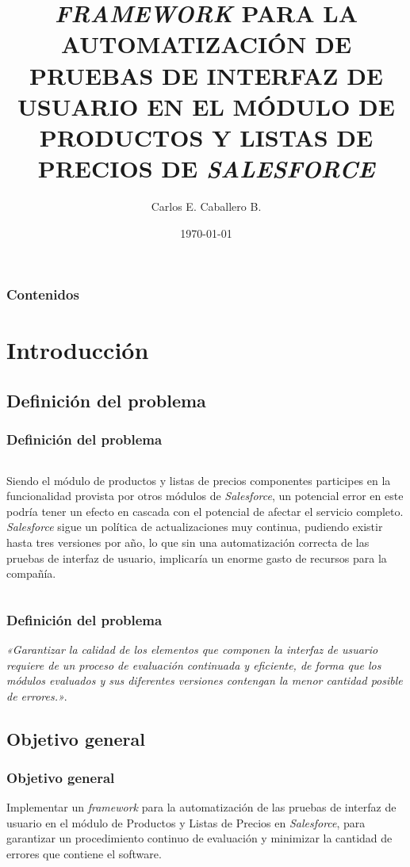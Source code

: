 \documentclass{beamer}
\title{\emph{FRAMEWORK} PARA LA AUTOMATIZACIÓN DE PRUEBAS DE INTERFAZ DE USUARIO
EN EL MÓDULO DE PRODUCTOS Y LISTAS DE PRECIOS DE \emph{SALESFORCE}}
\author{Carlos E. Caballero B.}
\date{\today}
\begin{document}
\begin{frame}
\titlepage
\end{frame}

\begin{frame}
\frametitle{Contenidos}
\tableofcontents
\end{frame}

\section{Introducción}

\subsection{Definición del problema}

\begin{frame}
\frametitle{Definición del problema}
\begin{columns}
Siendo el módulo de productos y listas de precios componentes participes en la
funcionalidad provista por otros módulos de \emph{Salesforce}, un potencial
error en este podría tener un efecto en cascada con el potencial de afectar el
servicio completo.
\emph{Salesforce} sigue un política de actualizaciones muy continua, pudiendo
existir hasta tres versiones por año, lo que sin una automatización correcta
de las pruebas de interfaz de usuario, implicaría un enorme gasto de recursos
para la compañía.
\end{columns}
\end{frame}

\begin{frame}
\frametitle{Definición del problema}
\emph{«Garantizar la calidad de los elementos que componen la interfaz de
usuario requiere de un proceso de evaluación continuada y eficiente, de forma
que los módulos evaluados y sus diferentes versiones contengan la menor
cantidad posible de errores.»}.
\end{frame}

\subsection{Objetivo general}

\begin{frame}
\frametitle{Objetivo general}
Implementar un \emph{framework} para la automatización de las pruebas de interfaz de
usuario en el módulo de Productos y Listas de Precios en \emph{Salesforce},
para garantizar un procedimiento continuo de evaluación y minimizar la cantidad
de errores que contiene el software.
\end{frame}
\end{document}
